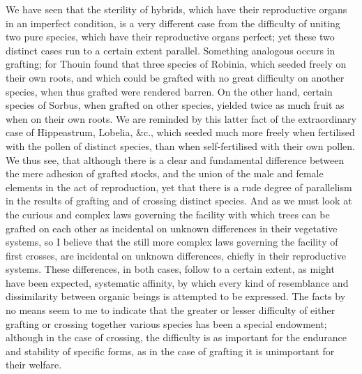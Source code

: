 \indent We have seen that the sterility of hybrids, which have their reproductive organs in an imperfect condition, is a very different case from the difficulty of uniting two pure species, which have their reproductive organs perfect; yet these two distinct cases run to a certain extent parallel. Something analogous occurs in grafting; for Thouin found that three species of Robinia, which seeded freely on their own roots, and which could be grafted with no great difficulty on another species, when thus grafted were rendered barren. On the other hand, certain species of Sorbus, when grafted on other species, yielded twice as much fruit as when on their own roots. We are reminded by this latter fact of the extraordinary case of Hippeastrum, Lobelia, \&c., which seeded much more freely when fertilised with the pollen of distinct species, than when self-fertilised with their own pollen.\\
\indent We thus see, that although there is a clear and fundamental difference between the mere adhesion of grafted stocks, and the union of the male and female elements in the act of reproduction, yet that there is a rude degree of parallelism in the results of grafting and of crossing distinct species. And as we must look at the curious and complex laws governing the facility with which trees can be grafted on each other as incidental on unknown differences in their vegetative systems, so I believe that the still more complex laws governing the facility of first crosses, are incidental on unknown differences, chiefly in their reproductive systems. These differences, in both cases, follow to a certain extent, as might have been expected, systematic affinity, by which every kind of resemblance and dissimilarity between organic beings is attempted to be expressed. The facts by no means seem to me to indicate that the greater or lesser difficulty of either grafting or crossing together various species has been a special endowment; although in the case of crossing, the difficulty is as important for the endurance and stability of specific forms, as in the case of grafting it is unimportant for their welfare.\\
